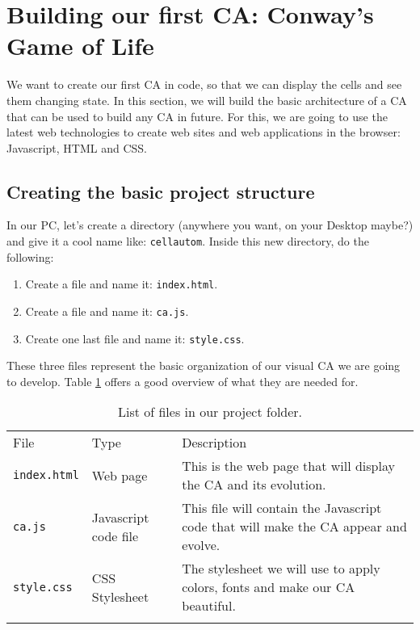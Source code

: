 
\section{Building our first CA: Conway's Game of Life}
\label{sec:simpleca}

We want to create our first CA in code, so that we can display the cells and see them changing
state. In this section, we will build the basic architecture of a CA that can be used to build any
CA in future. For this, we are going to use the latest web technologies to create web sites and
web applications in the browser: Javascript, HTML and CSS.

\subsection{Creating the basic project structure}
In our PC, let's create a directory (anywhere you want, on your Desktop maybe?) and give it
a cool name like: \texttt{cellautom}. Inside this new directory, do the following:

\begin{enumerate}
\item Create a file and name it: \texttt{index.html}.
\item Create a file and name it: \texttt{ca.js}.
\item Create one last file and name it: \texttt{style.css}.
\end{enumerate}

These three files represent the basic organization of our visual CA we are going to develop.
Table \ref{tab:files} offers a good overview of what they are needed for.

%
%
\begin{table}[!t]
\centering
\caption{List of files in our project folder.}
\label{tab:files}
%
%
\begin{tabular}{p{}p{}p{}}
\hline\noalign{\smallskip}
File & Type & Description \\
\noalign{\smallskip}\svhline\noalign{\smallskip}
\texttt{index.html} & Web page & This is the web page that will display the CA and its evolution.\\
\texttt{ca.js} & Javascript code file  & This file will contain the Javascript
code that will make the CA appear and evolve.\\
\texttt{style.css} & CSS Stylesheet & The stylesheet we will use to apply colors, fonts 
    and make our CA beautiful.\\
\noalign{\smallskip}\hline\noalign{\smallskip}
\end{tabular}
\end{table}
%

